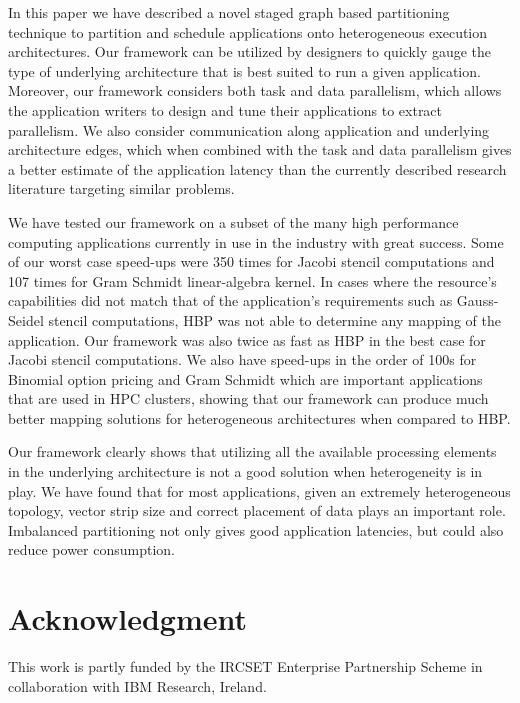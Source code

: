\documentclass[10pt, conference, compsocconf]{IEEEtran}
\begin{document}
In this paper we have described a novel staged graph based partitioning
technique to partition and schedule applications onto heterogeneous
execution architectures. Our framework can be utilized by designers to
quickly gauge the type of underlying architecture that is best suited to
run a given application. Moreover, our framework considers both task and
data parallelism, which allows the application writers to design and
tune their applications to extract parallelism. We also consider
communication along application and underlying architecture edges, which
when combined with the task and data parallelism gives a better estimate
of the application latency than the currently described research
literature targeting similar problems.

We have tested our framework on a subset of the many high performance
computing applications currently in use in the industry with great
success. Some of our worst case speed-ups were 350 times for Jacobi stencil
computations and 107 times for Gram Schmidt linear-algebra kernel. In
cases where the
resource's capabilities did not match that of the application's
requirements such as Gauss-Seidel stencil computations, HBP was not able to
determine any mapping of the
application.
Our framework was also twice as fast as HBP in the best case
for Jacobi stencil computations. We also have speed-ups in the
order of 100s for Binomial option pricing and Gram Schmidt which are
important applications that are used in HPC clusters, showing that our
framework can produce much better mapping solutions for heterogeneous
architectures when compared to HBP.

Our framework clearly shows that utilizing all the available
processing elements in the underlying architecture is not a good
solution when heterogeneity is in play. We have found that for most
applications, given an extremely heterogeneous topology, vector strip
size and correct placement of data plays an important role. Imbalanced
partitioning not only gives good application latencies, but could also reduce
power consumption.

\section{Acknowledgment}
This work is partly funded by the IRCSET Enterprise Partnership Scheme
in collaboration with IBM Research, Ireland.


\end{document}
